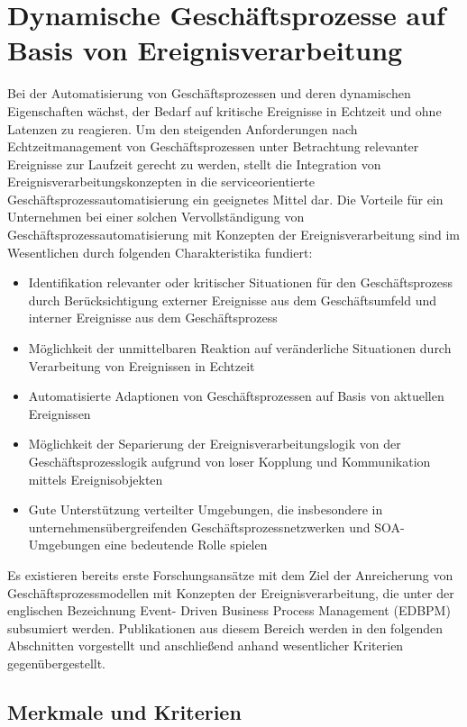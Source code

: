 \section{Dynamische Geschäftsprozesse auf Basis von Ereignisverarbeitung}\label{sec:Kombi}
Bei der Automatisierung von Geschäftsprozessen und deren dynamischen Eigenschaften wächst, der Bedarf auf kritische Ereignisse in Echtzeit und ohne Latenzen zu reagieren.
Um den steigenden Anforderungen nach Echtzeitmanagement von Geschäftsprozessen unter Betrachtung relevanter Ereignisse zur Laufzeit gerecht zu werden, stellt die Integration von Ereignisverarbeitungskonzepten in die serviceorientierte Geschäftsprozessautomatisierung ein geeignetes Mittel dar. Die Vorteile für ein Unternehmen bei einer solchen Vervollständigung von Geschäftsprozessautomatisierung mit Konzepten der Ereignisverarbeitung sind im Wesentlichen durch folgenden Charakteristika fundiert:

\begin{itemize}
    \item 
    Identifikation relevanter oder kritischer Situationen für den Geschäftsprozess durch Berücksichtigung externer Ereignisse aus dem Geschäftsumfeld und interner Ereignisse aus dem Geschäftsprozess
    \item 
    Möglichkeit der unmittelbaren Reaktion auf veränderliche Situationen durch Verarbeitung von Ereignissen in Echtzeit
    \item
    Automatisierte Adaptionen von Geschäftsprozessen auf Basis von aktuellen Ereignissen
    \item
    Möglichkeit der Separierung der Ereignisverarbeitungslogik von der Geschäftsprozesslogik aufgrund von loser Kopplung und Kommunikation mittels Ereignisobjekten
    \item
    Gute Unterstützung verteilter Umgebungen, die insbesondere in unternehmensübergreifenden Geschäftsprozessnetzwerken und \ac{SOA}-Umgebungen eine bedeutende Rolle spielen
\end{itemize}

Es existieren bereits erste Forschungsansätze mit dem Ziel der Anreicherung von Geschäftsprozessmodellen mit Konzepten der Ereignisverarbeitung, die unter der englischen Bezeichnung Event- Driven Business Process Management (EDBPM) subsumiert werden. Publikationen aus diesem Bereich werden in den folgenden Abschnitten vorgestellt und anschließend anhand wesentlicher Kriterien gegenübergestellt.

\subsection{Merkmale und Kriterien}

